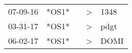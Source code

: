 \begin{supertabular}{lllll}
 07-09-16 &  *OS1* &   &  \textgreater &  1348 \\
 03-31-17 &  *OS1* &   &  \textgreater &  pdgt \\
 06-02-17 &  *OS1* &   &  \textgreater &  DOMI \\
\end{supertabular}
